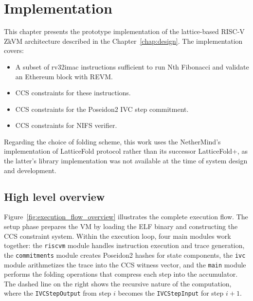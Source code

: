 \chapter{Implementation}\label{chap:implementation}

This chapter presents the prototype implementation of the lattice-based RISC-V
ZkVM architecture described in the Chapter~\ref{chap:design}.
The implementation covers:

\begin{itemize}
	\item A subset of rv32imac instructions sufficient to run Nth Fibonacci and validate an Ethereum block with REVM.
	\item CCS constraints for these instructions.
	\item CCS constraints for the Poseidon2 IVC step commitment.
	\item CCS constraints for NIFS verifier.
\end{itemize}

Regarding the choice of folding scheme, this work uses the NetherMind's implementation of LatticeFold
protocol rather than its successor LatticeFold+, as the latter's library
implementation was not available at the time of system design and development.











\section{High level overview}

Figure~\ref{fig:execution_flow_overview} illustrates the complete execution flow. The
setup phase prepares the VM by loading the ELF binary and constructing the CCS
constraint system. Within the execution loop, four main modules work together:
the \texttt{riscvm} module handles instruction execution and trace generation,
the \texttt{commitments} module creates Poseidon2 hashes for state components,
the \texttt{ivc} module arithmetizes the trace into the CCS witness vector,
and the \texttt{main} module performs the folding operations that
compress each step into the accumulator. The dashed line on the right shows the
recursive nature of the computation, where the \texttt{IVCStepOutput} from step
$i$ becomes the \texttt{IVCStepInput} for step $i+1$.

